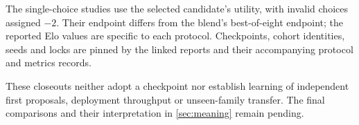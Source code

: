 The single-choice studies use the selected candidate's utility, with
invalid choices assigned $-2$. Their endpoint differs from the blend's
best-of-eight endpoint; the reported Elo values are specific to each
protocol. Checkpoints, cohort identities, seeds and locks are pinned by
the linked reports and their accompanying protocol and metrics records.

These closeouts neither adopt a checkpoint nor establish learning of
independent first proposals, deployment throughput or unseen-family
transfer. The final comparisons and their interpretation in
\cref{sec:meaning} remain pending.
